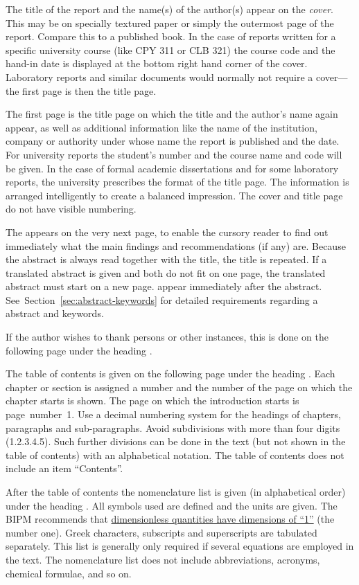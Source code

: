 \documentclass[a5paper, 10pt]{article}
\begin{document}
The title of the report and the name(s) of the author(s) appear on the
\emph{cover}. This may be on specially textured paper or simply the
outermost page of the report.  Compare this to a published book.  In
the case of reports written for a specific university course (like CPY
311 or CLB 321) the course code and the hand-in date is displayed at
the bottom right hand corner of the cover.  Laboratory reports and
similar documents would normally not require a cover---the first page
is then the title page.

The first page is the title page on which the title and the author's
name again appear, as well as additional information like the name of
the institution, company or authority under whose name the report is
published and the date.  For university reports the student's number
and the course name and code will be given.  In the case of formal
academic dissertations and for some laboratory reports, the university
prescribes the format of the title page.  The information is arranged
intelligently to create a balanced impression.  The cover and title
page do not have visible numbering.

The  appears on the very next page, to enable
the cursory reader to find out immediately what the main findings and
recommendations (if any) are.  Because the abstract is always read
together with the title, the title is repeated.  If a translated
abstract is given and both do not fit on one page, the translated
abstract must start on a new page.
 appear immediately after
the abstract.  See~Section~\ref{sec:abstract-keywords} for detailed
requirements regarding a abstract and keywords.

If the author wishes to thank persons or other instances, this is done
on the following page under the
heading .

The table of contents is given on the following page under the heading
.  Each chapter or section is assigned a number and the number
of the page on which the chapter starts is shown.  The page on which
the introduction starts is page~number~1.  Use a decimal numbering
system for the headings of chapters, paragraphs and sub-paragraphs.
Avoid subdivisions with more than four digits (1.2.3.4.5).  Such
further divisions can be done in the text (but not shown in the table
of contents) with an alphabetical notation. The table of contents does
not include an item ``Contents''.

After the table of contents the nomenclature list is given (in
alphabetical order) under the heading .  All
symbols used are defined and the units are given.
The BIPM recommends that \href{https://www.bipm.org/en/publications/si-brochure/section5-3-7.html}{dimensionless quantities have dimensions of ``1''} (the
number one).
Greek
characters, subscripts and superscripts are tabulated separately.
This list is generally only required if several equations are employed
in the text.  The nomenclature list does not include abbreviations,
acronyms, chemical formulae, and so on.
\end{document}
